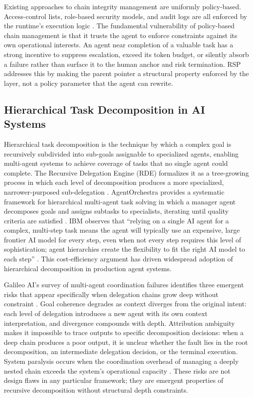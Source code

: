Existing approaches to chain integrity management are uniformly policy-based. Access-control lists, role-based security models, and audit logs are all enforced by the runtime's execution logic \cite{nist2023}. The fundamental vulnerability of policy-based chain management is that it trusts the agent to enforce constraints against its own operational interests. An agent near completion of a valuable task has a strong incentive to suppress escalation, exceed its token budget, or silently absorb a failure rather than surface it to the human anchor and risk termination. RSP addresses this by making the parent pointer a structural property enforced by the \fact{} layer, not a policy parameter that the agent can rewrite.

\subsection{Hierarchical Task Decomposition in AI Systems}\label{sec:task-decomposition}

Hierarchical task decomposition is the technique by which a complex goal is recursively subdivided into sub-goals assignable to specialized agents, enabling multi-agent systems to achieve coverage of tasks that no single agent could complete. The Recursive Delegation Engine (RDE) formalizes it as a tree-growing process in which each level of decomposition produces a more specialized, narrower-purposed sub-delegation \cite{rde2025}. AgentOrchestra provides a systematic framework for hierarchical multi-agent task solving in which a manager agent decomposes goals and assigns subtasks to specialists, iterating until quality criteria are satisfied \cite{agentorchestra2025}. IBM observes that ``relying on a single AI agent for a complex, multi-step task means the agent will typically use an expensive, large frontier AI model for every step, even when not every step requires this level of sophistication; agent hierarchies create the flexibility to fit the right AI model to each step'' \cite{ibm2025hierarchical}. This cost-efficiency argument has driven widespread adoption of hierarchical decomposition in production agent systems.

Galileo AI's survey of multi-agent coordination failures identifies three emergent risks that appear specifically when delegation chains grow deep without constraint \cite{multi_agent_coordination_strategies}. Goal coherence degrades as context diverges from the original intent: each level of delegation introduces a new agent with its own context interpretation, and divergence compounds with depth. Attribution ambiguity makes it impossible to trace outputs to specific decomposition decisions: when a deep chain produces a poor output, it is unclear whether the fault lies in the root decomposition, an intermediate delegation decision, or the terminal execution. System paralysis occurs when the coordination overhead of managing a deeply nested chain exceeds the system's operational capacity \cite{multi_agent_coordination_strategies}. These risks are not design flaws in any particular framework; they are emergent properties of recursive decomposition without structural depth constraints.

